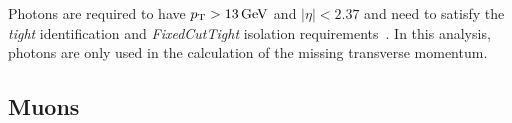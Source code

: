 Photons are required to have $p_{\textrm{T}} > \SI{13}{GeV}$ and $\vert\eta\vert<2.37$ and need to satisfy the \textit{tight} identification and \textit{FixedCutTight} isolation requirements~\cite{EGAM-2018-01}. In this analysis, photons are only used in the calculation of the missing transverse momentum.


\subsection{Muons}


